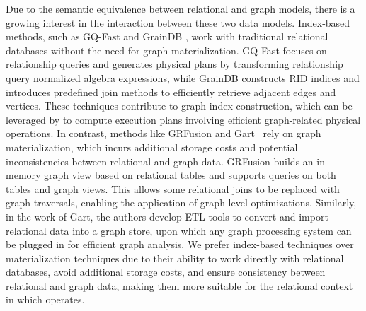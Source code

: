  Due to the semantic equivalence between relational and graph models, there is a growing interest in the interaction between these two data models. Index-based methods, such as GQ-Fast \cite{gqfast} and GrainDB \cite{graindb}, work with traditional relational databases without the need for graph materialization. GQ-Fast focuses on relationship queries and generates physical plans by transforming relationship query normalized algebra expressions, while GrainDB constructs RID indices and introduces predefined join methods to efficiently retrieve adjacent edges and vertices. These techniques contribute to graph index construction, which can be leveraged by \name to compute execution plans involving efficient graph-related physical operations. In contrast, methods like GRFusion \cite{GRFusion} and Gart~\cite{gart} rely on graph materialization, which incurs additional storage costs and potential inconsistencies between relational and graph data. GRFusion builds an in-memory graph view based on relational tables and supports queries on both tables and graph views. This allows some relational joins to be replaced with graph traversals, enabling the application of graph-level optimizations. Similarly, in the work of Gart, the authors develop ETL tools to convert and import relational data into a graph store, upon which any graph processing system can be plugged in for efficient graph analysis. We prefer index-based techniques over materialization techniques due to their ability to work directly with relational databases, avoid additional storage costs, and ensure consistency between relational and graph data, making them more suitable for the relational context in which \name operates.






